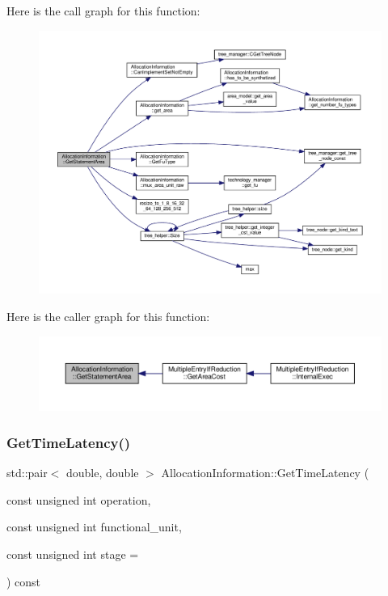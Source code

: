 Here is the call graph for this function\+:
\nopagebreak
\begin{figure}[H]
\begin{center}
\leavevmode
\includegraphics[width=350pt]{d7/d79/classAllocationInformation_a6b0a7b42d192682285f640c8499e142d_cgraph}
\end{center}
\end{figure}
Here is the caller graph for this function\+:
\nopagebreak
\begin{figure}[H]
\begin{center}
\leavevmode
\includegraphics[width=350pt]{d7/d79/classAllocationInformation_a6b0a7b42d192682285f640c8499e142d_icgraph}
\end{center}
\end{figure}
\mbox{\label{classAllocationInformation_a9958c6919a34a32bd500f4b8470d8b85}} 
\subsubsection{\texorpdfstring{Get\+Time\+Latency()}{GetTimeLatency()}\hspace{0.1cm}{\footnotesize\ttfamily [1/2]}}
{\footnotesize\ttfamily std\+::pair$<$ double, double $>$ Allocation\+Information\+::\+Get\+Time\+Latency (\begin{DoxyParamCaption}\item[{const unsigned int}]{operation,  }\item[{const unsigned int}]{functional\+\_\+unit,  }\item[{const unsigned int}]{stage = {} }\end{DoxyParamCaption}) const}



